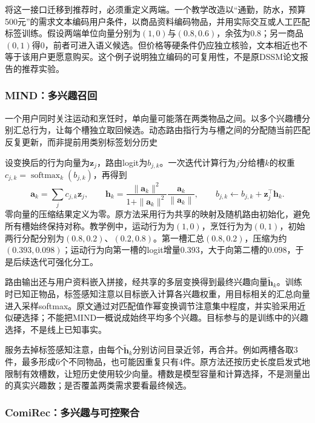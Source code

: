 将这一接口迁移到推荐时，必须重定义两端。一个教学改造以“通勤，防水，预算500元”的需求文本编码用户条件，以商品资料编码物品，并用实际交互或人工匹配标签训练。假设两端单位向量分别为$(1,0)$与$(0.8,0.6)$，余弦为0.8；另一商品$(0,1)$得0，前者可进入语义候选。但价格等硬条件仍应独立核验，文本相近也不等于该用户更愿意购买。这个例子说明独立编码的可复用性，不是原DSSM论文报告的推荐实验。

\Needspace{90mm}
\subsubsection{MIND：多兴趣召回}
\label{sec:rs-mind}

一个用户同时关注运动和烹饪时，单向量可能落在两类物品之间。以多个兴趣槽分别汇总行为，让每个槽独立取回候选。动态路由指行为与槽之间的分配随当前匹配反复更新，而非提前用类别标签划分历史

设变换后的行为向量为$\bm z_j$，路由logit为$b_{j,k}$。一次迭代计算行为$j$分给槽$k$的权重$c_{j,k}=\operatorname{softmax}_k(b_{j,k})$，再得到
\begin{equation}
 \bm a_k=\sum_j c_{j,k}\bm z_j,\qquad
 \bm h_k=\frac{\|\bm a_k\|^2}{1+\|\bm a_k\|^2}
                  \frac{\bm a_k}{\|\bm a_k\|},\qquad
 b_{j,k}\leftarrow b_{j,k}+\bm z_j^\top\bm h_k.
 \label{eq:rs-mind-routing}
\end{equation}
零向量的压缩结果定义为零。原方法采用行为共享的映射及随机路由初始化，避免所有槽始终保持对称。教学例中，运动行为为$(1,0)$，烹饪行为为$(0,1)$，初始两行分配分别为$(0.8,0.2)$、$(0.2,0.8)$。第一槽汇总$(0.8,0.2)$，压缩为约$(0.393,0.098)$；运动行为向第一槽的logit增量0.393，大于向第二槽的0.098，于是后续迭代可强化分工。

路由输出还与用户资料嵌入拼接，经共享的多层变换得到最终兴趣向量$\widetilde{\bm h}_k$。训练时已知正物品，标签感知注意以目标嵌入计算各兴趣权重，用目标相关的汇总向量进入采样softmax。原文通过对匹配值作幂变换调节注意集中程度，并实验采用近似硬选择；不能把MIND一概说成始终平均多个兴趣。目标参与的是训练中的兴趣选择，不是线上已知事实。

服务去掉标签感知注意，由每个$\widetilde{\bm h}_k$分别访问目录近邻，再合并。例如两槽各取3件，最多形成6个不同物品，也可能因重复只有4件。原方法还按历史长度启发式地限制有效槽数，让短历史使用较少向量。槽数是模型容量和计算选择，不是测量出的真实兴趣数；是否覆盖两类需求要看最终候选。

\subsubsection{ComiRec：多兴趣与可控聚合}
\label{sec:rs-comirec}


